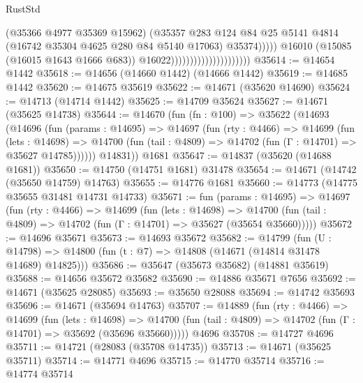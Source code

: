 \begin{lexlean}{RustStd}
\begin{coremodule}
                                                      (@35366 @4977 @35369 @15962)
                                                      (@35357
                                                        @283
                                                        @124
                                                        @84
                                                        @25
                                                        @5141
                                                        @4814
                                                        (@16742 @35304 @4625 @280 @84 @5140 @17063)
                                                        @35374)))))
                                              @16010
                                              (@15085 (@16015 @1643 @1666 @683))
                                              @16022)))))))))))))))))))))
@35614 := @14654 @1442
@35618 := @14656 (@14660 @1442) (@14666 @1442)
@35619 := @14685 @1442
@35620 := @14675 @35619
@35622 := @14671 (@35620 @14690)
@35624 := @14713 (@14714 @1442)
@35625 := @14709 @35624
@35627 := @14671 (@35625 @14738)
@35644 := @14670
    (fun (fn : @100) =>
    @35622
      (@14693
        (@14696
          (fun (params : @14695) =>
          @14697
            (fun (rty : @4466) =>
            @14699
              (fun (lets : @14698) =>
              @14700 (fun (tail : @4809) => @14702 (fun (Γ : @14701) => @35627 @14785))))))
        @14831))
    @1681
@35647 := @14837 (@35620 (@14688 @1681))
@35650 := @14750 (@14751 @1681) @31478
@35654 := @14671 (@14742 (@35650 @14759) @14763)
@35655 := @14776 @1681
@35660 := @14773 (@14775 @35655 @31481 @14731 @14733)
@35671 := fun (params : @14695) =>
  @14697
    (fun (rty : @4466) =>
    @14699
      (fun (lets : @14698) =>
      @14700 (fun (tail : @4809) => @14702 (fun (Γ : @14701) => @35627 (@35654 @35660)))))
@35672 := @14696 @35671
@35673 := @14693 @35672
@35682 := @14799
    (fun (U : @14798) => @14800 (fun (t : @7) => @14808 (@14671 (@14814 @31478 @14689) @14825)))
@35686 := @35647 (@35673 @35682) (@14881 @35619)
@35688 := @14656 @35672 @35682
@35690 := @14886 @35671 @7656
@35692 := @14671 (@35625 @28085)
@35693 := @35650 @28088
@35694 := @14742 @35693
@35696 := @14671 (@35694 @14763)
@35707 := @14889
    (fun (rty : @4466) =>
    @14699
      (fun (lets : @14698) =>
      @14700 (fun (tail : @4809) => @14702 (fun (Γ : @14701) => @35692 (@35696 @35660)))))
    @4696
@35708 := @14727 @4696
@35711 := @14721 (@28083 (@35708 @14735))
@35713 := @14671 (@35625 @35711)
@35714 := @14771 @4696
@35715 := @14770 @35714
@35716 := @14774 @35714

\end{coremodule}
\end{lexlean}
